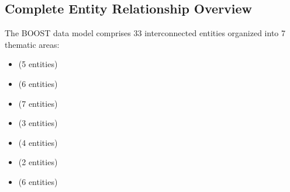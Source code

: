 
\subsection{Complete Entity Relationship Overview}
\label{sec:complete-erd-overview}

The BOOST data model comprises 33 interconnected entities organized into 7 thematic areas:

\begin{itemize}
    \item {} (5 entities)
    \item {} (6 entities)
    \item {} (7 entities)
    \item {} (3 entities)
    \item {} (4 entities)
    \item {} (2 entities)
    \item {} (6 entities)
\end{itemize}

